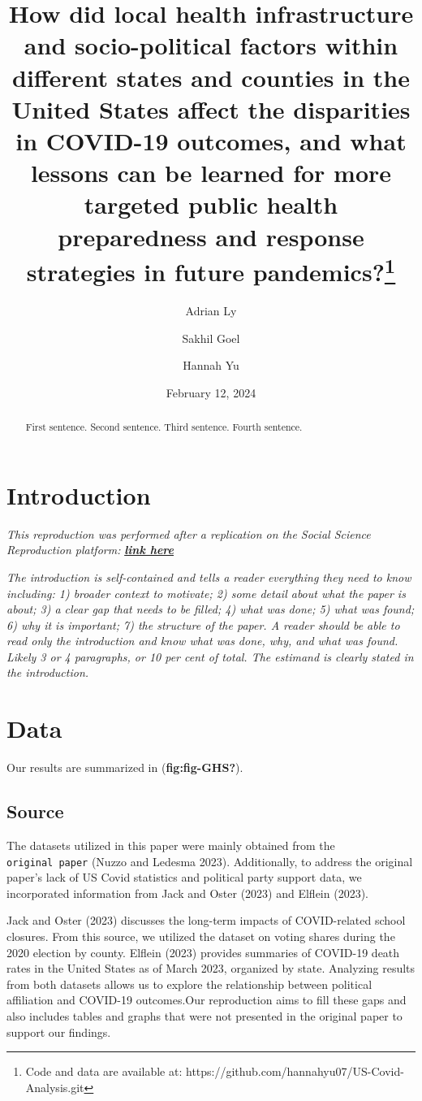 \documentclass[
  letterpaper,
  DIV=11,
  numbers=noendperiod]{scrartcl}
\title{How did local health infrastructure and socio-political factors
within different states and counties in the United States affect the
disparities in COVID-19 outcomes, and what lessons can be learned for
more targeted public health preparedness and response strategies in
future pandemics?\thanks{Code and data are available at:
https://github.com/hannahyu07/US-Covid-Analysis.git}}
\author{Adrian Ly \and Sakhil Goel \and Hannah Yu}
\date{February 12, 2024}
\renewcommand*\contentsname{Table of contents}
\newcommand\contentsname{Table of contents}
\begin{document}
\maketitle
\begin{abstract}
First sentence. Second sentence. Third sentence. Fourth sentence.
\end{abstract}

\renewcommand*\contentsname{Table of contents}
{
\hypersetup{linkcolor=}
\setcounter{tocdepth}{3}
\tableofcontents
}
\section{Introduction}\label{introduction}

\emph{This reproduction was performed after a replication on the Social
Science Reproduction platform:
}\textbf{\emph{\href{https://www.socialsciencereproduction.org/reproductions/c35e8e98-762d-4c00-a1a3-544ed0b2008d/index}{link
here}}}

\emph{The introduction is self-contained and tells a reader everything
they need to know including: 1) broader context to motivate; 2) some
detail about what the paper is about; 3) a clear gap that needs to be
filled; 4) what was done; 5) what was found; 6) why it is important; 7)
the structure of the paper. A reader should be able to read only the
introduction and know what was done, why, and what was found. Likely 3
or 4 paragraphs, or 10 per cent of total. The estimand is clearly stated
in the introduction.}

\section{Data}\label{sec-data}

Our results are summarized in (\textbf{fig:fig-GHS?}).

\subsection{Source}\label{source}

The datasets utilized in this paper were mainly obtained from the
\texttt{original\ paper} (Nuzzo and Ledesma 2023). Additionally, to
address the original paper's lack of US Covid statistics and political
party support data, we incorporated information from Jack and Oster
(2023) and Elflein (2023).

Jack and Oster (2023) discusses the long-term impacts of COVID-related
school closures. From this source, we utilized the dataset on voting
shares during the 2020 election by county. Elflein (2023) provides
summaries of COVID-19 death rates in the United States as of March 2023,
organized by state. Analyzing results from both datasets allows us to
explore the relationship between political affiliation and COVID-19
outcomes.Our reproduction aims to fill these gaps and also includes
tables and graphs that were not presented in the original paper to
support our findings.
\end{document}
